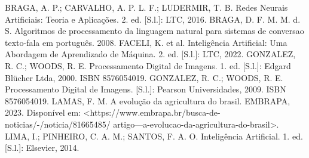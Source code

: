 \documentclass[conference]{IEEEtran}
\begin{document}
\begin{thebibliography}{00}
     BRAGA, A. P.; CARVALHO, A. P. L. F.; LUDERMIR, T. B. Redes Neurais
    Artificiais: Teoria e Aplicações. 2. ed. [S.l.]: LTC, 2016.
     BRAGA, D. F. M. M. d. S. Algoritmos de processamento da linguagem natural para
    sistemas de conversao texto-fala em português. 2008.
     FACELI, K. et al. Inteligência Artificial: Uma Abordagem de Aprendizado de
    Máquina. 2. ed. [S.l.]: LTC, 2022.
     GONZALEZ, R. C.; WOODS, R. E. Processamento Digital de Imagens. 1. ed. [S.l.]:
    Edgard Blücher Ltda, 2000. ISBN 8576054019.
     GONZALEZ, R. C.; WOODS, R. E. Processamento Digital de Imagens. [S.l.]:
    Pearson Universidades, 2009. ISBN 8576054019. 
     LAMAS, F. M. A evolução da agricultura do brasil. EMBRAPA, 2023.
    Disponível em: <https://www.embrapa.br/busca-de-noticias/-/noticia/81665485/
    artigo---a-evolucao-da-agricultura-do-brasil>.
     LIMA, I.; PINHEIRO, C. A. M.; SANTOS, F. A. O. Inteligência Artificial. 1. ed. [S.l.]:
    Elsevier, 2014.
\end{thebibliography}
\vspace{12pt}
\end{document}
